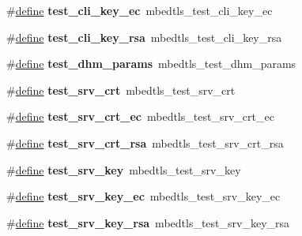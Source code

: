 \begin{DoxyCompactItemize}
\mbox{\label{compat-1_83_8h_a1a89baaeffc8f15033eb013f8a60b79c}} 
\#\hyperlink{structdefine}{define} {\bfseries test\+\_\+cli\+\_\+key\+\_\+ec}~mbedtls\+\_\+test\+\_\+cli\+\_\+key\+\_\+ec
\item 
\mbox{\label{compat-1_83_8h_ab66e6d2920e319a5b9b8d9882dfd7bef}} 
\#\hyperlink{structdefine}{define} {\bfseries test\+\_\+cli\+\_\+key\+\_\+rsa}~mbedtls\+\_\+test\+\_\+cli\+\_\+key\+\_\+rsa
\item 
\mbox{\label{compat-1_83_8h_a84c81dbefeecc274e17153a2f41033b8}} 
\#\hyperlink{structdefine}{define} {\bfseries test\+\_\+dhm\+\_\+params}~mbedtls\+\_\+test\+\_\+dhm\+\_\+params
\item 
\mbox{\label{compat-1_83_8h_a08fb570c1e3ed022958d4dc37b81acaa}} 
\#\hyperlink{structdefine}{define} {\bfseries test\+\_\+srv\+\_\+crt}~mbedtls\+\_\+test\+\_\+srv\+\_\+crt
\item 
\mbox{\label{compat-1_83_8h_a4fb413106fbdc0e5b8010afaf9c5b29f}} 
\#\hyperlink{structdefine}{define} {\bfseries test\+\_\+srv\+\_\+crt\+\_\+ec}~mbedtls\+\_\+test\+\_\+srv\+\_\+crt\+\_\+ec
\item 
\mbox{\label{compat-1_83_8h_af750059aa45bf2a0048eada5107fa622}} 
\#\hyperlink{structdefine}{define} {\bfseries test\+\_\+srv\+\_\+crt\+\_\+rsa}~mbedtls\+\_\+test\+\_\+srv\+\_\+crt\+\_\+rsa
\item 
\mbox{\label{compat-1_83_8h_ad6b27d97c583610e3d5567f3f00f9060}} 
\#\hyperlink{structdefine}{define} {\bfseries test\+\_\+srv\+\_\+key}~mbedtls\+\_\+test\+\_\+srv\+\_\+key
\item 
\mbox{\label{compat-1_83_8h_af726754c9792c5a6400fc13132a4334b}} 
\#\hyperlink{structdefine}{define} {\bfseries test\+\_\+srv\+\_\+key\+\_\+ec}~mbedtls\+\_\+test\+\_\+srv\+\_\+key\+\_\+ec
\item 
\mbox{\label{compat-1_83_8h_a23870332d47f392a81f2ee7fca45ec03}} 
\#\hyperlink{structdefine}{define} {\bfseries test\+\_\+srv\+\_\+key\+\_\+rsa}~mbedtls\+\_\+test\+\_\+srv\+\_\+key\+\_\+rsa
\item 

\end{DoxyCompactItemize}
